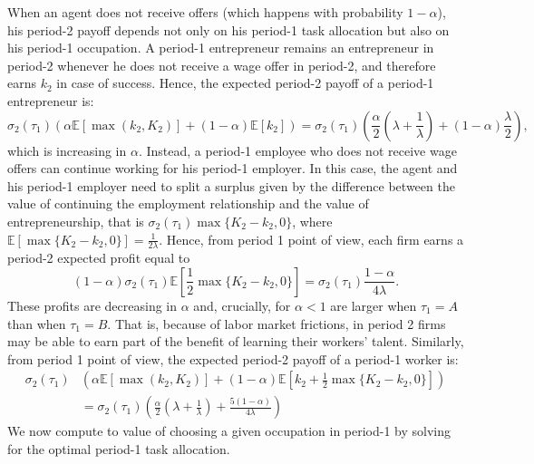 \documentclass[12pt,american]{paper}
\theoremstyle{remark}
\begin{document}
When an agent does not receive offers (which happens with probability $1-\alpha$), his period-2 payoff depends not only on his period-1 task allocation but also on his period-1 occupation. A period-1 entrepreneur remains an entrepreneur in period-2 whenever he does not receive a wage offer in period-2, and therefore earns $k_2$ in case of success. Hence, the expected period-2 payoff of a period-1 entrepreneur is:
\[
\sigma_2(\tau_1)\left(\alpha \mathbb E[\max(k_2,K_2)]+(1-\alpha)\mathbb E[k_2] \right)
=\sigma_2(\tau_1) \left(  \frac{\alpha}{2} \left( \lambda + \frac{1}{\lambda} \right) + (1-\alpha) \frac{\lambda}{2} \right),
\]
which is increasing in $\alpha$.
Instead, a period-1 employee who does not receive wage offers can continue working for his period-1 employer. In this case, the agent and his period-1 employer need to split a surplus given by the difference between the value of continuing the employment relationship and the value of entrepreneurship, that is $\sigma_2(\tau_1)\max \{K_2-k_2,0\}$, where $\mathbb E[\max \{K_2-k_2,0\}]=\frac{1}{2\lambda}$. %
Hence,  from period 1 point of view, each firm earns a period-2 expected profit equal to
\[
(1-\alpha) \sigma_2(\tau_1)\mathbb {E}\left[\frac{1}{2}\max\{K_2-k_2,0\}\right]= \sigma_2(\tau_1)  \frac{1-\alpha}{4 \lambda}.
\]
%
These profits are decreasing in $\alpha$ and, crucially, for $\alpha<1$ are larger when $\tau_1=A$ than when $\tau_1=B$. That is, because of labor market frictions, in period 2 firms may be able to earn part of the benefit of learning their workers' talent. Similarly, from period 1 point of view, the expected period-2 payoff of a period-1 worker is:
\begin{align*}
\sigma_2(\tau_1)&\left(\alpha \mathbb E[\max(k_2,K_2)]+(1-\alpha) \mathbb {E}\left[k_2+\frac{1}{2}\max\{K_2-k_2,0\}\right]\right)\\
&=\sigma_2(\tau_1) \left(  \frac{\alpha}{2} \left( \lambda + \frac{1}{\lambda} \right) +  \frac{5(1-\alpha)}{4 \lambda} \right)
\end{align*}
%
We now compute to value of choosing a given occupation in period-1 by solving for the optimal period-1 task allocation.
\end{document}
